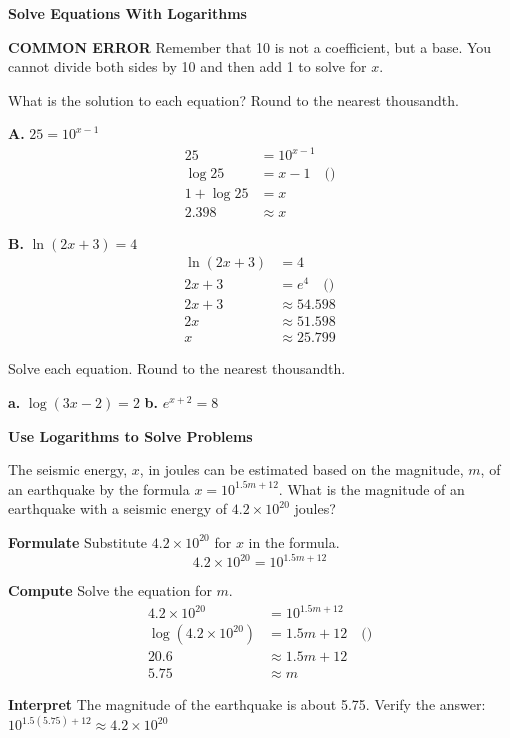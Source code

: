 \documentclass{article}
\newenvironment{example}[1]{}{}
\newenvironment{tryit}[1]{}{}
\newcommand{\placeholder}[2]{}
\begin{document}
\begin{example}{5}
\textbf{Solve Equations With Logarithms}

\textbf{COMMON ERROR}
Remember that 10 is not a coefficient, but a base. You cannot divide both sides by 10 and then add 1 to solve for $x$.

What is the solution to each equation? Round to the nearest thousandth.

\textbf{A.} $25 = 10^{x-1}$
\begin{align*}
25 &= 10^{x-1} \\
\log 25 &= x - 1 \quad \text{(\placeholder{diagram}{Callout: Convert to logarithmic form.}})\\
1 + \log 25 &= x \\
2.398 &\approx x
\end{align*}

\textbf{B.} $\ln (2x + 3) = 4$
\begin{align*}
\ln (2x + 3) &= 4 \\
2x + 3 &= e^4 \quad \text{(\placeholder{diagram}{Callout: Convert to exponential form.}})\\
2x + 3 &\approx 54.598 \\
2x &\approx 51.598 \\
x &\approx 25.799
\end{align*}
\end{example}

\begin{tryit}{5}
Solve each equation. Round to the nearest thousandth.

\textbf{a.} $\log (3x - 2) = 2$ \qquad \textbf{b.} $e^{x+2} = 8$
\end{tryit}

\begin{example}{6}
\textbf{Use Logarithms to Solve Problems}

The seismic energy, $x$, in joules can be estimated based on the magnitude, $m$, of an earthquake by the formula $x = 10^{1.5m+12}$. What is the magnitude of an earthquake with a seismic energy of $4.2 \times 10^{20}$ joules?

\placeholder{illustration}{Earthquake Magnitude Scale showing categories: 2.5 or less, 2.5 to 5.4, 5.5 to 6.0, 6.1 to 6.9, 7.0 to 7.9, 8.0 or greater, next to a drawing of a cracked landscape.}

\textbf{Formulate} \quad Substitute $4.2 \times 10^{20}$ for $x$ in the formula.
$$4.2 \times 10^{20} = 10^{1.5m+12}$$

\textbf{Compute} \quad Solve the equation for $m$.
\begin{align*}
4.2 \times 10^{20} &= 10^{1.5m+12} \\
\log (4.2 \times 10^{20}) &= 1.5m + 12 \quad \text{(\placeholder{diagram}{Callout: Rewrite in logarithmic form.}})\\
20.6 &\approx 1.5m + 12 \\
5.75 &\approx m
\end{align*}

\textbf{Interpret} \quad The magnitude of the earthquake is about 5.75.
Verify the answer: $10^{1.5(5.75)+12} \approx 4.2 \times 10^{20}$
\end{example}
\end{document}
